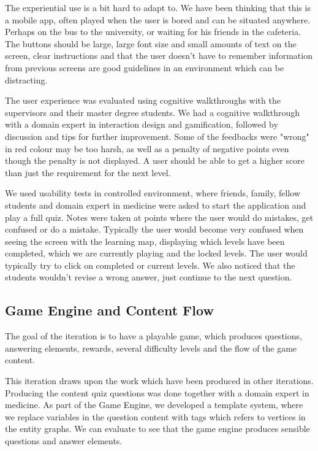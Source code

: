 The experiential use is a bit hard to adapt to. We have been thinking that this is a mobile app, often played when the user is bored and can be situated anywhere. Perhaps on the bus to the university, or waiting for his friends in the cafeteria. The buttons should be large, large font size and small amounts of text on the screen, clear instructions and that the user doesn't have to remember information from previous screens are good guidelines in an environment which can be distracting.

The user experience was evaluated using cognitive walkthroughs with the supervisors and their master degree students. We had a cognitive walkthrough with a domain expert in interaction design and gamification, followed by discussion and tips for further improvement. Some of the feedbacks were "wrong" in red colour may be too harsh, as well as a penalty of negative points even though the penalty is not displayed. A user should be able to get a higher score than just the requirement for the next level.

We used usability tests in controlled environment, where friends, family, fellow students and domain expert in medicine were asked to start the application and play a full quiz. Notes were taken at points where the user would do  mistakes, get confused or do a mistake. Typically the user would become very confused when seeing the screen with the learning map, displaying which levels have been completed, which we are currently playing and the locked levels. The user would typically try to click on completed or current levels. We also noticed that the students wouldn't revise a wrong answer, just continue to the next question.


\subsection{Game Engine and Content Flow}
The goal of the iteration is to have a playable game, which produces questions, answering elements, rewards, several difficulty levels and the flow of the game content.

This iteration draws upon the work which have been produced in other iterations. Producing the content quiz questions was done together with a domain expert in medicine. As part of the Game Engine, we developed a template system, where we replace variables in the question content with tags which refers to vertices in the entity graphs. We can evaluate to see that the game engine produces sensible questions and answer elements.

